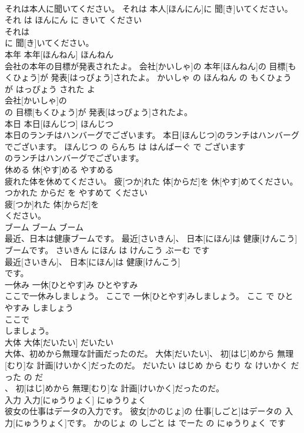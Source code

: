 \documentclass[8pt]{extreport}
\begin{document}
\begin{CJK}{UTF8}{min}
\\	それは本人に聞いてください。	それは 本人[ほんにん]に 聞[き]いてください。	それ は ほんにん に きいて ください	
\\	それは
\\	に 聞[き]いてください。			
\\	本年	本年[ほんねん]	ほんねん	
\\	会社の本年の目標が発表されたよ。	会社[かいしゃ]の 本年[ほんねん]の 目標[もくひょう]が 発表[はっぴょう]されたよ。	かいしゃ の ほんねん の もくひょう が はっぴょう された よ	
\\	会社[かいしゃ]の
\\	の 目標[もくひょう]が 発表[はっぴょう]されたよ。			
\\	本日	本日[ほんじつ]	ほんじつ	
\\	本日のランチはハンバーグでございます。	本日[ほんじつ]のランチはハンバーグでございます。	ほんじつ の らんち は はんばーぐ で ございます	
\\	のランチはハンバーグでございます。			
\\	休める	休[やす]める	やすめる	
\\	疲れた体を休めてください。	疲[つか]れた 体[からだ]を 休[やす]めてください。	つかれた からだ を やすめて ください	
\\	疲[つか]れた 体[からだ]を
\\	ください。			
\\	ブーム	ブーム	ブーム	
\\	最近、日本は健康ブームです。	最近[さいきん]、 日本[にほん]は 健康[けんこう]ブームです。	さいきん にほん は けんこう ぶーむ です	
\\	最近[さいきん]、 日本[にほん]は 健康[けんこう]
\\	です。			
\\	一休み	一休[ひとやす]み	ひとやすみ	
\\	ここで一休みしましょう。	ここで 一休[ひとやす]みしましょう。	ここ で ひとやすみ しましょう	
\\	ここで
\\	しましょう。			
\\	大体	大体[だいたい]	だいたい	
\\	大体、初めから無理な計画だったのだ。	大体[だいたい]、 初[はじ]めから 無理[むり]な 計画[けいかく]だったのだ。	だいたい はじめ から むり な けいかく だった の だ	
\\	、 初[はじ]めから 無理[むり]な 計画[けいかく]だったのだ。			
\\	入力	入力[にゅうりょく]	にゅうりょく	
\\	彼女の仕事はデータの入力です。	彼女[かのじょ]の 仕事[しごと]はデータの 入力[にゅうりょく]です。	かのじょ の しごと は でーた の にゅうりょく です	

\end{CJK}
\end{document}
